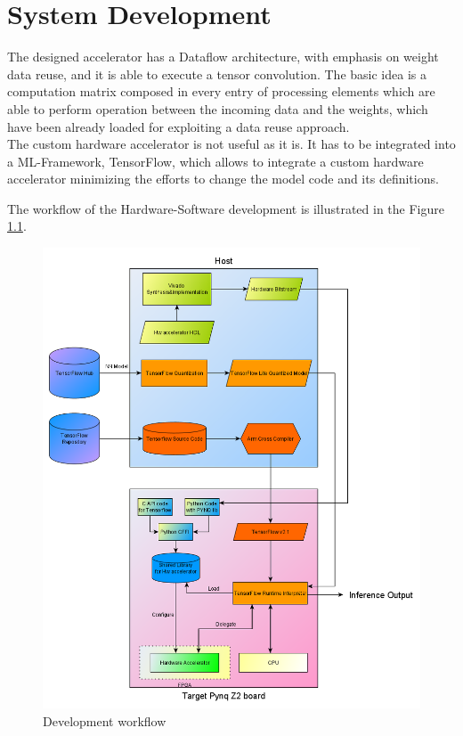 \chapter{System Development}

The designed accelerator has a Dataflow architecture, with emphasis on weight data reuse, and it is able to execute a tensor convolution. The basic idea is a computation matrix composed in every entry of processing elements which are able to perform operation between the incoming data and the weights, which have been already loaded for exploiting a data reuse approach.\\
The custom hardware accelerator is not useful as it is. It has to be integrated into a ML-Framework, TensorFlow, which allows to integrate a custom hardware accelerator minimizing the efforts to change the model code and its definitions.

The workflow of the Hardware-Software development is illustrated in the Figure \ref{fig:workflow}.
\begin{figure}[!htbp]
\centering
\captionsetup{justification=centering}
\includegraphics[scale=0.5]{./figure/workflow.png}
\caption{Development workflow}
\label{fig:workflow}
\end{figure}

